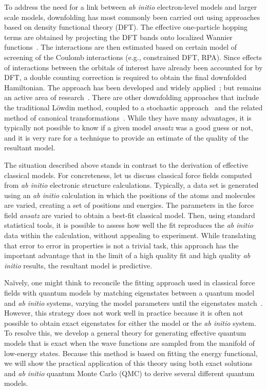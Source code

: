 To address the need for a link between {\it ab initio} electron-level models and larger scale models, downfolding has most commonly been carried out using approaches based on density functional theory (DFT). The effective one-particle hopping terms are obtained by projecting the DFT bands onto localized Wannier functions~\cite{Pavirini}. 
The interactions are then estimated based on certain model of screening of the Coulomb interactions (e.g., constrained DFT, RPA). 
Since effects of interactions between the orbitals of interest have already been accounted for by DFT, a double counting correction is required to obtain the final downfolded Hamiltonian. 
The approach has been developed and widely applied~\cite{Pavirini, Dasgupta, Aryasetiawan2004, Jeschke2013}; but remains an active area of research~\cite{Haule_doublecounting}.
There are other downfolding approaches that include the traditional L\"owdin method, coupled to a stochastic approach~\cite{Tenno,Zhou_Ceperley} and the related method of canonical transformations~\cite{White_CT, Yanai_CT}. 
While they have many advantages, it is typically not possible to know if a given model {\it ansatz} was a good guess or not, and it is very rare for a technique to provide an estimate of the quality of the resultant model. 

The situation described above stands in contrast to the derivation of effective classical models. 
For concreteness, let us discuss classical force fields computed from {\it ab initio} electronic structure calculations. 
Typically, a data set is generated using an {\it ab initio} calculation in which the positions of the atoms and molecules are varied, creating a set of positions and energies. 
The parameters in the force field {\it ansatz} are varied to obtain a best-fit classical model.
Then, using standard statistical tools, it is possible to assess how well the fit reproduces the {\it ab initio} data within the calculation, without appealing to experiment. 
While translating that error to error in properties is not a trivial task, this approach has the important advantage that in the limit of a high quality fit and high quality {\it ab initio} results, the resultant model is predictive.

Na\"ively, one might think to reconcile the fitting approach used in classical force fields with quantum models by matching eigenstates between a quantum model and {\it ab initio} systems, varying the model parameters until the eigenstates match~\cite{Wagner2013}. 
However, this strategy does not work well in practice because it is often not possible to obtain exact eigenstates for either the model or the {\it ab initio} system.
To resolve this, we develop a general theory for generating effective quantum models that is exact when the wave functions are sampled from the manifold of low-energy states. 
Because this method is based on fitting the energy functional, we will show the practical application of this theory using both exact solutions and {\it ab initio} quantum Monte Carlo (QMC) to derive several different quantum models.


